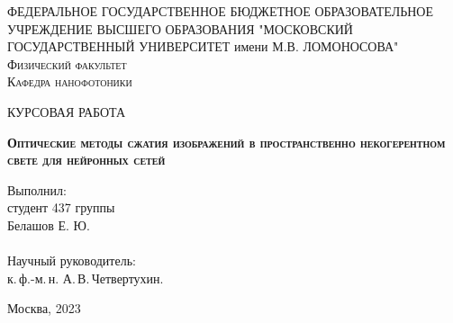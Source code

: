 \begin{titlepage}
	\begin{center}
		\large
		ФЕДЕРАЛЬНОЕ ГОСУДАРСТВЕННОЕ БЮДЖЕТНОЕ ОБРАЗОВАТЕЛЬНОЕ УЧРЕЖДЕНИЕ ВЫСШЕГО ОБРАЗОВАНИЯ "МОСКОВСКИЙ ГОСУДАРСТВЕННЫЙ УНИВЕРСИТЕТ имени М.В. ЛОМОНОСОВА"\\
		\bigskip\large
		\textsc{Физический факультет\\Кафедра нанофотоники}
		\vspace*{\fill}
		\LARGE\bfseries
		\begin{center}
			\textsc{КУРСОВАЯ РАБОТА}
		\end{center}
		\LARGE\bfseries\textsc{Оптические методы сжатия изображений в пространственно некогерентном свете для нейронных сетей}
	\end{center}
	\normalsize
	\vspace*{5cm}
	\begin{flushright}
		Выполнил:\\
		студент 437 группы\\
		Белашов Е. Ю.\\  
		\hspace{3cm}\\
		Научный руководитель:\\
		к.\,ф.-м.\,н. А.\,В.\,Четвертухин.\\

	\end{flushright}
	
	\vspace*{\fill}
	\begin{center}
		Москва, 2023
	\end{center}
\end{titlepage}
